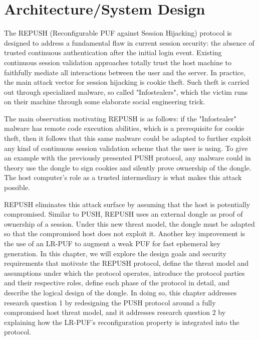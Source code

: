 
\chapter{Architecture/System Design}
\label{chapter:design}

The REPUSH (Reconfigurable PUF against Session Hijacking) protocol is designed to address a fundamental flaw in current session security: the absence of trusted continuous authentication after the initial login event. Existing continuous session validation approaches totally trust the host machine to faithfully mediate all interactions between the user and the server. In practice, the main attack vector for session hijacking is cookie theft. Such theft is carried out through specialized malware, so called "Infostealers", which the victim runs on their machine through some elaborate social engineering trick. 

The main observation motivating REPUSH is as follows: if the "Infostealer" malware has remote code execution abilities, which is a prerequisite for cookie theft, then it follows that this same malware could be adapted to further exploit any kind of continuous session validation scheme that the user is using. To give an example with the previously presented PUSH protocol, any malware could in theory use the dongle to sign cookies and silently prove ownership of the dongle. The host computer's role as a trusted intermediary is what makes this attack possible. 

REPUSH eliminates this attack surface by assuming that the host is potentially compromised. Similar to PUSH, REPUSH uses an external dongle as proof of ownership of a session. Under this new threat model, the dongle must be adapted so that the compromised host does not exploit it. Another key improvement is the use of an LR-PUF to augment a weak PUF for fast ephemeral key generation. In this chapter, we will explore the design goals and security requirements that motivate the REPUSH protocol, define the threat model and assumptions under which the protocol operates, introduce the protocol parties and their respective roles, define each phase of the protocol in detail, and describe the logical design of the dongle. In doing so, this chapter addresses research question 1 by redesigning the PUSH protocol around a fully compromised host threat model, and it addresses research question 2 by explaining how the LR-PUF's reconfiguration property is integrated into the protocol.  

